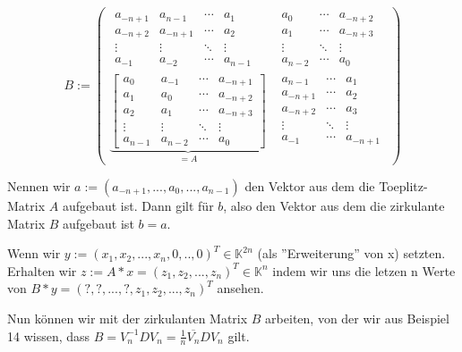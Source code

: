 \documentclass[]{article}
\begin{document}
\[
B := 
\begin{pmatrix}
	\begin{matrix}
		a_{-n+1} & a_{n-1}  & \cdots & a_{1}   \\
		a_{-n+2} & a_{-n+1} & \cdots & a_{2}   \\
		\vdots   & \vdots   & \ddots & \vdots  \\
		a_{-1}   & a_{-2}   & \cdots & a_{n-1} 
	\end{matrix} &
	\begin{matrix}
		a_{0}   & \cdots & a_{-n+2} \\
		a_{1}   & \cdots & a_{-n+3} \\
		\vdots  & \ddots & \vdots   \\
		a_{n-2} & \cdots & a_{0} 
	\end{matrix} \\

	\underbrace{
		\begin{bmatrix}
			a_{0}   & a_{-1}  & \cdots & a_{-n+1}  \\
			a_{1}   & a_{0}   & \cdots & a_{-n+2}  \\
			a_{2}   & a_{1}   & \cdots & a_{-n+3}  \\
			\vdots  & \vdots  & \ddots & \vdots    \\
			a_{n-1} & a_{n-2} & \cdots & a_{0} 
		\end{bmatrix}
	}_{=A}
	 &
	\begin{matrix}
		a_{n-1}  & \cdots & a_{1}    \\
		a_{-n+1} & \cdots & a_{2}    \\
		a_{-n+2} & \cdots & a_{3}    \\
		\vdots   & \ddots & \vdots   \\
		a_{-1}   & \cdots & a_{-n+1} 
	\end{matrix}
\end{pmatrix}
\]

Nennen wir $a:=(a_{-n+1}, ..., a_0, ..., a_{n-1})$ den Vektor aus dem die Toeplitz-Matrix $A$ aufgebaut ist. Dann gilt für $b$, also den Vektor aus dem die zirkulante Matrix $B$ aufgebaut ist $b=a$.

Wenn wir $y:=(x_1, x_2, ..., x_n, 0, .., 0)^T \in \mathbb{K}^{2n}$ (als ''Erweiterung'' von x) setzten. Erhalten wir $z:=A*x = (z_1, z_2, ..., z_n)^T \in \mathbb{K}^n$ indem wir uns die letzen n Werte von $B*y=(?, ?, ..., ?, z_1, z_2, ..., z_n)^T$ ansehen.

Nun können wir mit der zirkulanten Matrix $B$ arbeiten, von der wir aus Beispiel 14 wissen, dass $B=V_n^{-1}DV_n=\frac{1}{n}\overline{V_n}DV_n$ gilt.
\end{document}
